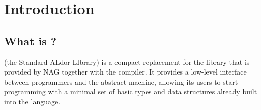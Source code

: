 % 
% 
% 
% 
% 
\section{Introduction}

\subsection*{What is \salli?}
\salli (the Standard ALdor LIbrary) is a compact replacement for the
\axllib library that is provided by NAG together with the \aldor compiler.
It provides a low-level interface between \aldor programmers and the
abstract machine, allowing its users to start programming with a minimal
set of basic types and data structures already built into the language.

